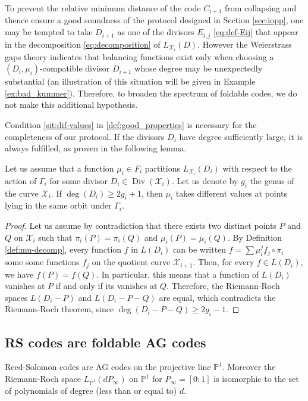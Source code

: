 \documentclass[10pt,a4paper]{article}
\newcommand\PP{\mathbb{P}}
\DeclareMathOperator{\Div}{Div}
\newcommand\calX{\mathcal{X}}
\theoremstyle{plain}
\theoremstyle{plain}
\theoremstyle{definition}
\theoremstyle{remark}
\theoremstyle{plain}
\begin{document}
To prevent the relative minimum distance of the code $C_{i+1}$ from collapsing and thence ensure a good soundness of the protocol designed in Section \ref{sec:iopp}, one may be tempted to take $D_{i+1}$ as one of the divisors $E_{i,j}$ \eqref{eq:def-Eij} that appear in the decomposition \eqref{eq:decomposition} of $L_{\calX_i}(D)$. However the Weierstrass gaps theory indicates that balancing functions exist only when choosing a $(D_i,\mu_i)$-compatible divisor $D_{i+1}$ whose degree may be unexpectedly substantial (an illustration of this situation will be given in Example \ref{ex:bad_kummer}). Therefore, to broaden the spectrum of foldable codes, we do not make this additional hypothesis.

Condition \ref{sit:dif-values} in \autoref{def:good_properties} is necessary for the completeness of our protocol. If the divisors $D_i$ have degree sufficiently large, it is always fulfilled, as proven in the following lemma.

\begin{lemma}\label{lem:mu-ok-interpolation}
	Let us assume that a function $\mu_i \in F_i$ partitions $L_{\calX_i}(D_i)$ with respect to the action of $\Gamma_i$ for some divisor $D_i \in \Div(\calX_i)$. Let us denote by $g_i$ the genus of the curve $\calX_i$. If $\deg(D_i)  \geq 2g_i+1$, then $\mu_i$ takes different values at points lying in the same orbit under $\Gamma_i$.
\end{lemma}

\begin{proof}
	Let us assume by contradiction that there exists two distinct points $P$ and $Q$ on $\calX_i$ such that $\pi_i(P)=\pi_i(Q)$ and $\mu_i(P)=\mu_i(Q)$. By Definition \ref{def:mu-decomp}, every function $f$ in $L(D_i)$ can be written $f=\sum\mu_i^j f_j \circ \pi_i$ some some functions $f_j$ on the quotient curve $\calX_{i+1}$. Then, for every $f \in L(D_i)$, we have $f(P)=f(Q)$. In particular, this means that a function of $L(D_i)$ vanishes at $P$ if and only if its vanishes at $Q$. Therefore, the Riemann-Roch spaces $L(D_i-P)$ and $L(D_i-P-Q)$ are equal, which contradicts the Riemann-Roch theorem, since $\deg(D_i-P-Q) \geq 2g_i-1$.
\end{proof} 


\subsection{RS codes are foldable AG codes}\label{ex:RS-foldable}

Reed-Solomon codes are AG codes on the projective line $\PP^1$. Moreover the Riemann-Roch space $L_{\PP^1}(d P_\infty)$ on $\PP^1$ for $P_\infty=[0:1]$ is isomorphic to 
the set of polynomials of degree (less than or equal to) $d$.
\end{document}
